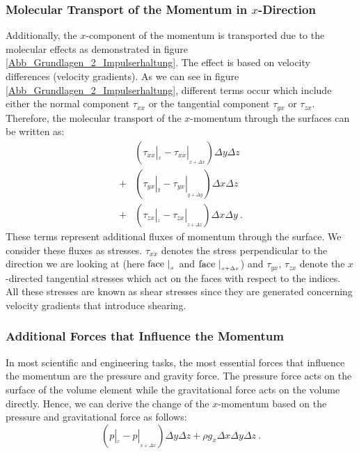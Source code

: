\documentclass[MathematicsNumericsDerivationsAndOpenFOAM.tex]{subfiles}
\begin{document}
\subsubsection{Molecular Transport of the Momentum in $x$-Direction}
%
%
%
%
	Additionally, the $x$-component of the momentum is transported due to
    the molecular effects as demonstrated in figure
    \ref{Abb_Grundlagen_2_Impulserhaltung}. The effect is based on velocity
    differences (velocity gradients). As we can see in figure
    \ref{Abb_Grundlagen_2_Impulserhaltung}, different terms occur which include
    either the normal component $\tau_{xx}$ or the tangential component
    $\tau_{yx}$ or $\tau_{zx}$. Therefore, the molecular transport of the
    $x$-momentum through the surfaces can be written as:
%
%
\begin{align*}
  &\left(
    \tau_{xx} |_{_x} - \tau_{xx} |_{_{x+\Delta x}}
  \right)
  \Delta y \Delta z \\
  +&\left(
    \tau_{yx} |_{_y} - \tau_{yx} |_{_{y+\Delta y}}
  \right)
  \Delta x \Delta z \\
  +&\left(
    \tau_{zx} |_{_z} - \tau_{zx} |_{_{z+\Delta z}}
  \right)
  \Delta x \Delta y ~.
\end{align*}
%
%
      These terms represent additional fluxes of momentum through the surface.
      We consider these fluxes as stresses. $\tau_{xx}$ denotes the stress
      perpendicular to the direction we are looking at
      (here $\mathrm{face}~|_{_x}$ and $\mathrm{face}~|_{_{x+\Delta x}}$) and
      $\tau_{yx}$, $\tau_{zx}$ denote the $x$-directed tangential stresses
      which act on the faces with respect to the indices. All these stresses
      are known as shear stresses since they are generated concerning velocity
      gradients that introduce shearing.
%
%
%
%
\subsubsection{Additional Forces that Influence the Momentum}
%
%
%
      In most scientific and engineering tasks, the most essential forces that
      influence the momentum are the pressure and gravity force. The pressure
      force acts on the surface of the volume element while the gravitational
      force acts on the volume directly. Hence, we can derive the change of
      the $x$-momentum based on the pressure and gravitational force as follows:
%
%
\begin{equation*}
  \left(
    p|_{_x} - p|_{_{x+\Delta x}}
  \right)
  \Delta y \Delta z
+
  \rho g_x \Delta x \Delta y \Delta z ~.
\end{equation*}
%
%
%
%
\end{document}
